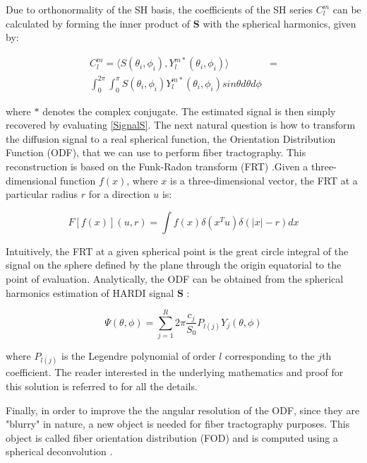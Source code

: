 \documentclass{cys}
\begin{document}
Due to orthonormality of the SH basis, the coefficients of the SH series $C_l^m$ can be calculated by forming the inner product of $\mathbf{S}$ with the spherical harmonics, given by:

\begin{equation}
\begin{split}
C_l^m = \langle S(\theta_i,\phi_i),Y_l^{m\ast}(\theta_i,\phi_i) \rangle &= \\ \int_0^{2\pi} \int_0^\pi S(\theta_i,\phi_i)Y_l^{m\ast}(\theta_i,\phi_i) sin \theta d\theta d\phi
\end{split}
\end{equation}

where $\ast$ denotes  the  complex conjugate. The estimated signal is then simply recovered by evaluating \ref{SignalS}. The next natural question is how to transform the diffusion signal to a real spherical function, the Orientation Distribution Function (ODF), that we can use to perform fiber tractography. This reconstruction is based on the Funk-Radon transform (FRT) \cite{funk1915geometrische}.Given a three-dimensional function $f(x)$, where $x$ is a three-dimensional vector, the FRT at a particular radius $r$ for a direction $u$ is:

\begin{equation}
F[f(x)](u,r)=\int f(x)\delta(x^T u)\delta(|x|-r)dx
\end{equation} 

Intuitively, the FRT at a given spherical point is the great circle integral of the signal on the sphere defined by the plane through the origin equatorial to the point of evaluation. Analytically, the ODF can be obtained from the spherical harmonics estimation of HARDI signal $\mathbf{S}$ \cite{descoteaux2007regularized, hess2006q, anderson2005measurement}:


\begin{equation}
\Psi(\theta,\phi)=\sum_{j=1}^R 2\pi\frac{c_j}{S_0}P_{l(j)}Y_j(\theta,\phi)
\end{equation}

where $P_{l(j)}$ is the Legendre polynomial of order $l$ corresponding to the $j$th coefficient. The reader interested in the underlying mathematics and proof for this solution is referred to \cite{descoteaux2008high} for all the details. 

\bigskip
Finally, in order to improve the the angular resolution of the ODF, since they are "blurry" in nature, a new object is needed for fiber tractography purposes. This object is called fiber orientation distribution (FOD) and is computed using a spherical deconvolution \cite{tournier2004direct}.  
\end{document}
